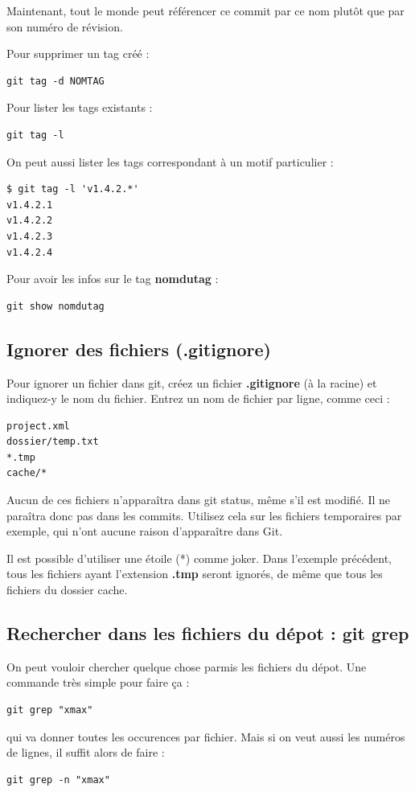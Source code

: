 \documentclass[a4paper,twoside]{article}
\begin{document}
Maintenant, tout le monde peut référencer ce commit par ce nom plutôt que par son numéro de révision.

\bigskip

Pour supprimer un tag créé :
\begin{verbatim}
git tag -d NOMTAG
\end{verbatim}

\bigskip

Pour lister les tags existants :
\begin{verbatim}
git tag -l
\end{verbatim}

On peut aussi lister les tags correspondant à un motif particulier : 
\begin{verbatim}
$ git tag -l 'v1.4.2.*'
v1.4.2.1
v1.4.2.2
v1.4.2.3
v1.4.2.4
\end{verbatim}

\bigskip

Pour avoir les infos sur le tag \textbf{nomdutag} : 
\begin{verbatim}
git show nomdutag
\end{verbatim}



\subsection{Ignorer des fichiers (.gitignore)}\label{sec:gitignore}
Pour ignorer un fichier dans git, créez un fichier \textbf{.gitignore} (à la racine) et indiquez-y le nom du fichier. Entrez un nom de fichier par ligne, comme ceci :
\begin{verbatim}
project.xml
dossier/temp.txt
*.tmp
cache/*
\end{verbatim}
Aucun de ces fichiers n'apparaîtra dans git status, même s'il est modifié. Il ne paraîtra donc pas dans les commits.
Utilisez cela sur les fichiers temporaires par exemple, qui n'ont aucune raison d'apparaître dans Git.

Il est possible d'utiliser une étoile (*) comme joker. Dans l'exemple précédent, tous les fichiers ayant l'extension \textbf{.tmp} seront ignorés, de même que tous les fichiers du dossier cache.

\subsection{Rechercher dans les fichiers du dépot : git grep}
On peut vouloir chercher quelque chose parmis les fichiers du dépot. Une commande très simple pour faire ça : 
\begin{verbatim}
git grep "xmax"
\end{verbatim}
qui va donner toutes les occurences par fichier. Mais si on veut aussi les numéros de lignes, il suffit alors de faire :
\begin{verbatim}
git grep -n "xmax"
\end{verbatim}
\end{document}
